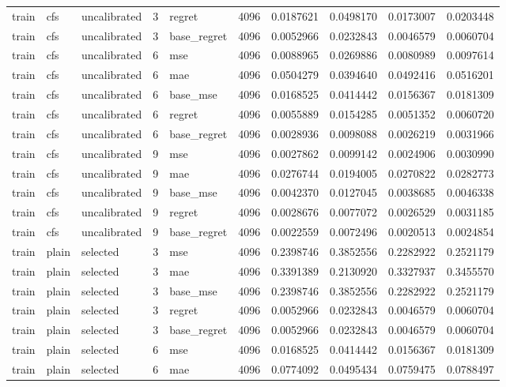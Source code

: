\begin{tabular}{lllrlrrrrr}
train & cfs & uncalibrated & 3 & regret & 4096 & 0.0187621 & 0.0498170 & 0.0173007 & 0.0203448 \\
train & cfs & uncalibrated & 3 & base_regret & 4096 & 0.0052966 & 0.0232843 & 0.0046579 & 0.0060704 \\
train & cfs & uncalibrated & 6 & mse & 4096 & 0.0088965 & 0.0269886 & 0.0080989 & 0.0097614 \\
train & cfs & uncalibrated & 6 & mae & 4096 & 0.0504279 & 0.0394640 & 0.0492416 & 0.0516201 \\
train & cfs & uncalibrated & 6 & base_mse & 4096 & 0.0168525 & 0.0414442 & 0.0156367 & 0.0181309 \\
train & cfs & uncalibrated & 6 & regret & 4096 & 0.0055889 & 0.0154285 & 0.0051352 & 0.0060720 \\
train & cfs & uncalibrated & 6 & base_regret & 4096 & 0.0028936 & 0.0098088 & 0.0026219 & 0.0031966 \\
train & cfs & uncalibrated & 9 & mse & 4096 & 0.0027862 & 0.0099142 & 0.0024906 & 0.0030990 \\
train & cfs & uncalibrated & 9 & mae & 4096 & 0.0276744 & 0.0194005 & 0.0270822 & 0.0282773 \\
train & cfs & uncalibrated & 9 & base_mse & 4096 & 0.0042370 & 0.0127045 & 0.0038685 & 0.0046338 \\
train & cfs & uncalibrated & 9 & regret & 4096 & 0.0028676 & 0.0077072 & 0.0026529 & 0.0031185 \\
train & cfs & uncalibrated & 9 & base_regret & 4096 & 0.0022559 & 0.0072496 & 0.0020513 & 0.0024854 \\
train & plain & selected & 3 & mse & 4096 & 0.2398746 & 0.3852556 & 0.2282922 & 0.2521179 \\
train & plain & selected & 3 & mae & 4096 & 0.3391389 & 0.2130920 & 0.3327937 & 0.3455570 \\
train & plain & selected & 3 & base_mse & 4096 & 0.2398746 & 0.3852556 & 0.2282922 & 0.2521179 \\
train & plain & selected & 3 & regret & 4096 & 0.0052966 & 0.0232843 & 0.0046579 & 0.0060704 \\
train & plain & selected & 3 & base_regret & 4096 & 0.0052966 & 0.0232843 & 0.0046579 & 0.0060704 \\
train & plain & selected & 6 & mse & 4096 & 0.0168525 & 0.0414442 & 0.0156367 & 0.0181309 \\
train & plain & selected & 6 & mae & 4096 & 0.0774092 & 0.0495434 & 0.0759475 & 0.0788497 \\

\end{tabular}

